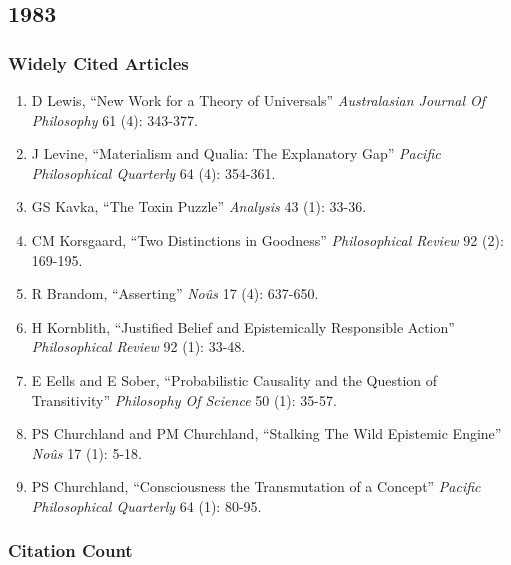 \documentclass[
  10pt,
  letterpaper,
  DIV=11,
  numbers=noendperiod,
  twoside]{scrartcl}
\providecommand{\tightlist}{%
  \setlength{\itemsep}{0pt}\setlength{\parskip}{0pt}}\usepackage{longtable,booktabs,array}
\begin{document}
\newpage

\subsection{1983}\label{section-7}

\subsubsection*{Widely Cited Articles}\label{widely-cited-articles-7}

\begin{enumerate}
\def\labelenumi{\arabic{enumi}.}
\tightlist
\item
  D Lewis, ``New Work for a Theory of Universals'' \emph{Australasian
  Journal Of Philosophy} 61 (4): 343-377.
\item
  J Levine, ``Materialism and Qualia: The Explanatory Gap''
  \emph{Pacific Philosophical Quarterly} 64 (4): 354-361.
\item
  GS Kavka, ``The Toxin Puzzle'' \emph{Analysis} 43 (1): 33-36.
\item
  CM Korsgaard, ``Two Distinctions in Goodness'' \emph{Philosophical
  Review} 92 (2): 169-195.
\item
  R Brandom, ``Asserting'' \emph{Noûs} 17 (4): 637-650.
\item
  H Kornblith, ``Justified Belief and Epistemically Responsible Action''
  \emph{Philosophical Review} 92 (1): 33-48.
\item
  E Eells and E Sober, ``Probabilistic Causality and the Question of
  Transitivity'' \emph{Philosophy Of Science} 50 (1): 35-57.
\item
  PS Churchland and PM Churchland, ``Stalking The Wild Epistemic
  Engine'' \emph{Noûs} 17 (1): 5-18.
\item
  PS Churchland, ``Consciousness the Transmutation of a Concept''
  \emph{Pacific Philosophical Quarterly} 64 (1): 80-95.
\end{enumerate}

\subsubsection*{Citation Count}\label{citation-count-7}
\end{document}
